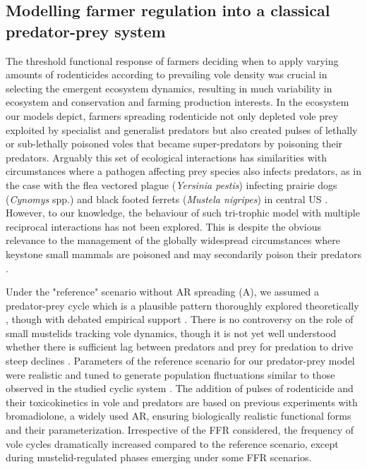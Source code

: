 \documentclass[11pt]{article}
\begin{document}
\subsection{Modelling farmer regulation into a classical predator-prey system}
 
The threshold functional response of farmers deciding when to apply varying amounts of rodenticides according to prevailing vole density was crucial in selecting the emergent ecosystem dynamics, resulting in much variability in ecosystem and conservation and farming production interests. In the ecosystem our models depict, farmers spreading rodenticide not only depleted vole prey exploited by specialist and generalist predators but also created pulses of lethally or sub-lethally poisoned voles that became super-predators by poisoning their predators.
%
Arguably this set of ecological interactions has similarities with circumstances where a pathogen affecting prey species also infects predators, as in the case with the flea vectored plague (\textit{Yersinia pestis}) infecting prairie dogs (\textit{Cynomys} spp.) and black footed ferrets (\textit{Mustela nigripes}) in central US \citep{Matchett2010}. However, to our knowledge, the behaviour of such tri-trophic model with multiple reciprocal interactions has not been explored. This is despite the obvious relevance to the management of the globally widespread circumstances where keystone small mammals are poisoned and may secondarily poison their predators \citep{Delibes-Mateos2011}.

Under the "reference" scenario without AR spreading (A), we assumed a predator-prey cycle which is a plausible pattern thoroughly explored theoretically \citep{Hanski2001}, though with debated empirical support \cite{Lambin2018}.
%
There is no controversy on the role of small mustelids tracking vole dynamics, though it is not yet well understood whether there is sufficient lag between predators and prey for predation to drive steep declines \citep{King2006}. Parameters of the reference scenario for our predator-prey model were realistic and tuned to generate population fluctuations similar to those observed in the studied cyclic system \citep{Delattre2009}.  The addition of pulses of rodenticide and their toxicokinetics in vole and predators are based on previous experiments with bromadiolone, a widely used AR, ensuring biologically realistic functional forms and their parameterization. Irrespective of the FFR considered, the frequency of vole cycles dramatically increased compared to the reference scenario, except during mustelid-regulated phases emerging under some FFR scenarios.
\end{document}
